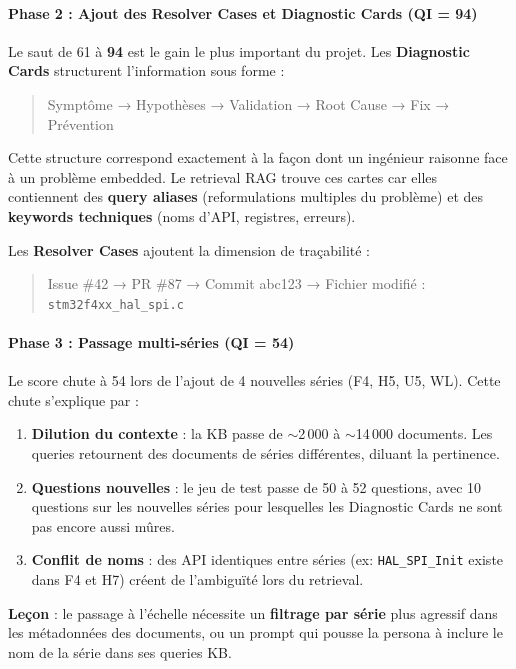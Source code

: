 \paragraph{Phase 2 : Ajout des Resolver Cases et Diagnostic Cards (QI = 94)}

Le saut de 61 à \textbf{94} est le gain le plus important du projet. Les \textbf{Diagnostic Cards} structurent l'information sous forme :

\begin{quote}
Symptôme → Hypothèses → Validation → Root Cause → Fix → Prévention
\end{quote}

Cette structure correspond exactement à la façon dont un ingénieur raisonne face à un problème embedded. Le retrieval RAG trouve ces cartes car elles contiennent des \textbf{query aliases} (reformulations multiples du problème) et des \textbf{keywords techniques} (noms d'API, registres, erreurs).

Les \textbf{Resolver Cases} ajoutent la dimension de traçabilité :
\begin{quote}
Issue \#42 → PR \#87 → Commit abc123 → Fichier modifié : \texttt{stm32f4xx\_hal\_spi.c}
\end{quote}

\paragraph{Phase 3 : Passage multi-séries (QI = 54)}

Le score chute à 54 lors de l'ajout de 4 nouvelles séries (F4, H5, U5, WL). Cette chute s'explique par :

\begin{enumerate}
  \item \textbf{Dilution du contexte} : la KB passe de $\sim$2\,000 à $\sim$14\,000 documents. Les queries retournent des documents de séries différentes, diluant la pertinence.
  \item \textbf{Questions nouvelles} : le jeu de test passe de 50 à 52 questions, avec 10 questions sur les nouvelles séries pour lesquelles les Diagnostic Cards ne sont pas encore aussi mûres.
  \item \textbf{Conflit de noms} : des API identiques entre séries (ex: \texttt{HAL\_SPI\_Init} existe dans F4 et H7) créent de l'ambiguïté lors du retrieval.
\end{enumerate}

\textbf{Leçon} : le passage à l'échelle nécessite un \textbf{filtrage par série} plus agressif dans les métadonnées des documents, ou un prompt qui pousse la persona à inclure le nom de la série dans ses queries KB.


